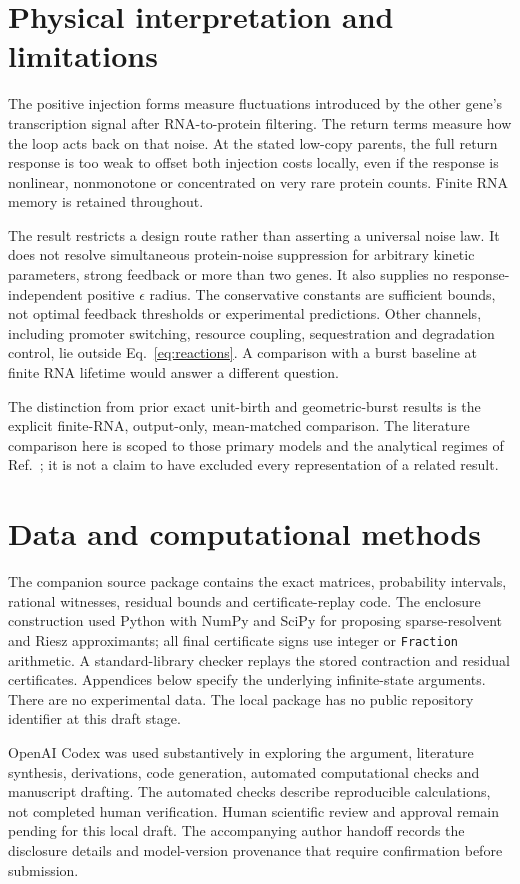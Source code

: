 \documentclass[11pt]{article}
\begin{document}
\section{Physical interpretation and limitations}

The positive injection forms measure fluctuations introduced by the
other gene's transcription signal after RNA-to-protein filtering.
The return terms measure how the loop acts back on that noise.
At the stated low-copy parents, the full return response is too weak
to offset both injection costs locally, even if the response is
nonlinear, nonmonotone or concentrated on very rare protein counts.
Finite RNA memory is retained throughout.

The result restricts a design route rather than asserting a universal
noise law. It does not resolve simultaneous protein-noise suppression
for arbitrary kinetic parameters, strong feedback or more than two genes.
It also supplies no response-independent positive $\epsilon$ radius.
The conservative constants are sufficient bounds, not optimal feedback
thresholds or experimental predictions. Other channels, including
promoter switching, resource coupling, sequestration and degradation
control, lie outside Eq.~\eqref{eq:reactions}. A comparison with a burst
baseline at finite RNA lifetime would answer a different question.

The distinction from prior exact unit-birth and geometric-burst results
is the explicit finite-RNA, output-only, mean-matched comparison.
The literature comparison here is scoped to those primary models and
the analytical regimes of Ref.~\citep{Yan2019}; it is not a claim to
have excluded every representation of a related result.

\section*{Data and computational methods}
The companion source package contains the exact matrices, probability
intervals, rational witnesses, residual bounds and certificate-replay code.
The enclosure construction used Python with NumPy and SciPy for
proposing sparse-resolvent and Riesz approximants; all final certificate
signs use integer or \texttt{Fraction} arithmetic. A standard-library
checker replays the stored contraction and residual certificates.
Appendices below specify the underlying infinite-state arguments.
There are no experimental data. The local package has no public
repository identifier at this draft stage.

OpenAI Codex was used substantively in exploring the argument,
literature synthesis, derivations, code generation, automated
computational checks and manuscript drafting. The automated checks
describe reproducible calculations, not completed human verification.
Human scientific review and approval remain pending for this local
draft. The accompanying author handoff records the disclosure details
and model-version provenance that require confirmation before submission.

\appendix



\end{document}
